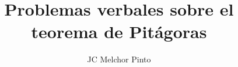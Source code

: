 \documentclass[12pt,addpoints]{guia}
\title{Problemas verbales sobre el teorema de Pitágoras}
\author{JC Melchor Pinto}
\begin{document}
\INFO%
\begin{multicols}{2}
    
    
    
\end{multicols}
\ejemplosboxed[]
\begin{questions}
    \questionboxed[10]{}
    \ejemplosboxed[]
    \questionboxed[10]{}
    \questionboxed[10]{}
    \ejemplosboxed[]
    \questionboxed[15]{}
    \questionboxed[10]{}
    \questionboxed[10]{}
    \questionboxed[15]{}
    \ejemplosboxed[]
    \questionboxed[10]{}
    \questionboxed[10]{}
\end{questions}
\end{document}
